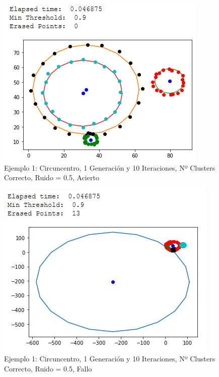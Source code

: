 \documentclass[conference,a4paper]{IEEEtran}
\begin{document}
\begin{figure}[H]
\centering
\includegraphics[scale=0.65]{Experimentacion/Ejemplo1/ej1_c_1_10_lr_correct}
\caption{Ejemplo 1: Circuncentro, 1 Generación y 10 Iteraciones,  Nº Clusters Correcto, Ruido = 0.5, Acierto\\}
\end{figure}

\begin{figure}[H]
\centering
\includegraphics[scale=0.65]{Experimentacion/Ejemplo1/ej1_c_1_10_lr_wrong}
\caption{Ejemplo 1: Circuncentro, 1 Generación y 10 Iteraciones,  Nº Clusters Correcto, Ruido = 0.5, Fallo\\}
\end{figure}
\end{document}
